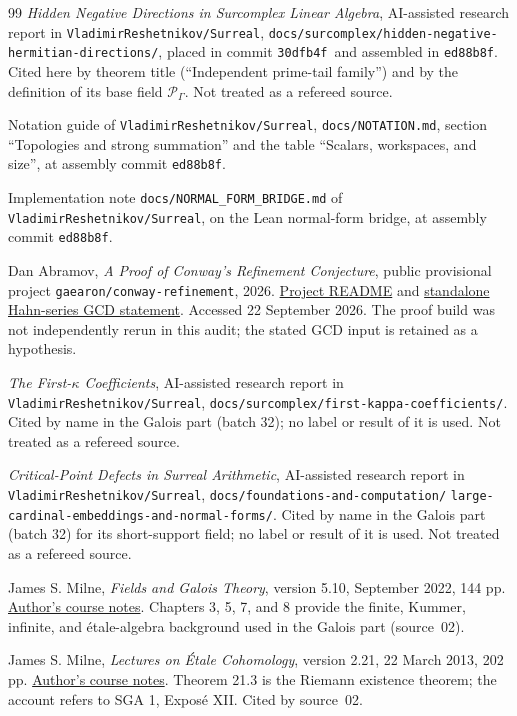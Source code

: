 \documentclass[11pt,letterpaper]{article}
\theoremstyle{definition}
\theoremstyle{remark}
\newcommand{\repo}{\texttt{VladimirReshetnikov/Surreal}}
\newcommand{\placecommit}{\texttt{30dfb4f}}
\newcommand{\assemblycommit}{\texttt{ed88b8f}}
\begin{document}
\begin{thebibliography}{99}
\emph{Hidden Negative Directions in Surcomplex Linear Algebra}, AI-assisted
research report in \repo,
\texttt{docs/surcomplex/hidden-negative-hermitian-directions/}, placed in
commit \placecommit\ and assembled in \assemblycommit. Cited here by theorem title (``Independent prime-tail
family'') and by the definition of its base field $\mathscr P_\Gamma$.
Not treated as a refereed source.

Notation guide of \repo, \texttt{docs/NOTATION.md}, section ``Topologies and
strong summation'' and the table ``Scalars, workspaces, and size'', at assembly
commit \assemblycommit.

Implementation note \texttt{docs/NORMAL\_FORM\_BRIDGE.md} of \repo, on the
Lean normal-form bridge, at assembly commit \assemblycommit.

Dan Abramov, \emph{A Proof of Conway's Refinement Conjecture},
public provisional project \texttt{gaearon/conway-refinement}, 2026.
\href{https://github.com/gaearon/conway-refinement}{Project README} and
\href{https://github.com/gaearon/conway-refinement/blob/main/ConwayRefinement/Standalone/Mathlib/HahnSeriesGCD.lean}{standalone Hahn-series GCD statement}.
Accessed 22 September 2026. The proof build was not independently rerun in
this audit; the stated GCD input is retained as a hypothesis.

\emph{The First-$\kappa$ Coefficients}, AI-assisted research report in \repo,
\texttt{docs/surcomplex/first-kappa-coefficients/}. Cited by name in the
Galois part (batch 32); no label or result of it is used. Not treated as a
refereed source.

\emph{Critical-Point Defects in Surreal Arithmetic}, AI-assisted research
report in \repo, \texttt{docs/foundations-and-computation/}\allowbreak
\texttt{large-cardinal-embeddings-and-normal-forms/}. Cited by name in the
Galois part (batch 32) for its short-support field; no label or result of it
is used. Not treated as a refereed source.

James S. Milne,
\emph{Fields and Galois Theory}, version 5.10, September 2022, 144 pp.
\href{https://www.jmilne.org/math/CourseNotes/FT.pdf}{Author's course notes}.
Chapters 3, 5, 7, and 8 provide the finite, Kummer, infinite, and
\'etale-algebra background used in the Galois part (source~02).

James S. Milne,
\emph{Lectures on \'Etale Cohomology}, version 2.21, 22 March 2013, 202 pp.
\href{https://www.jmilne.org/math/CourseNotes/LEC.pdf}{Author's course notes}.
Theorem 21.3 is the Riemann existence theorem; the account refers to
SGA 1, Expos\'e XII. Cited by source~02.


\end{thebibliography}
\end{document}
